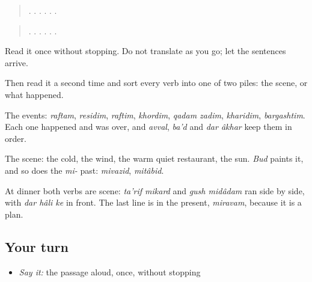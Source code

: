 \begin{tcolorbox}[breakable,skin=enhanced,colback=orange!6,colframe=orange!45!black,boxrule=0.5pt,arc=1mm,left=6pt,right=6pt,top=4pt,bottom=4pt,fonttitle=\bfseries,title={Read this}]
\begin{quote}
         .       .      .       .     .               .
\end{quote}

\begin{quote}
        .      .          .       .       .    .
\end{quote}

Read it once without stopping. Do not translate as you go; let the sentences arrive.

Then read it a second time and sort every verb into one of two piles: the scene, or what happened.
\end{tcolorbox}

\begin{culture}
The events: \emph{raftam}, \emph{residim}, \emph{raftim}, \emph{khordim}, \emph{qadam zadim}, \emph{kharidim}, \emph{bargashtim}. Each one happened and was over, and \emph{avval}, \emph{ba'd} and \emph{dar âkhar} keep them in order.

The scene: the cold, the wind, the warm quiet restaurant, the sun. \emph{Bud} paints it, and so does the \emph{mi-} past: \emph{mivazid}, \emph{mitâbid}.

At dinner both verbs are scene: \emph{ta'rif mikard} and \emph{gush midâdam} ran side by side, with \emph{dar hâli ke} in front. The last line is in the present, \emph{miravam}, because it is a plan.
\end{culture}

\subsection*{Your turn}
\begin{itemize}
\raggedright
  \item \emph{Say it:} the passage aloud, once, without stopping
\end{itemize}

